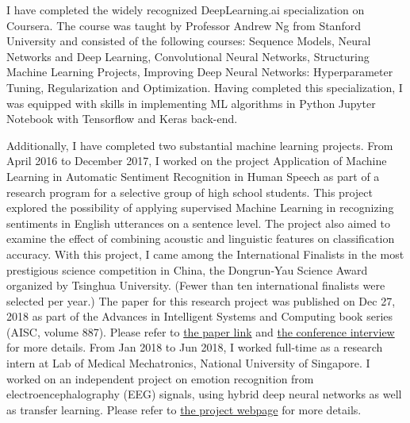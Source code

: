 \documentclass[11pt,reqno,oneside,a4paper]{article}
\begin{document}
	I have completed the widely recognized DeepLearning.ai specialization on Coursera. The course was taught by Professor Andrew Ng from Stanford University and consisted of the following courses: Sequence Models, Neural Networks and Deep Learning, Convolutional Neural Networks, Structuring Machine Learning Projects, Improving Deep Neural Networks: Hyperparameter Tuning, Regularization and Optimization. Having completed this specialization, I was equipped with skills in implementing ML algorithms in Python Jupyter Notebook with Tensorflow and Keras back-end.  
	
	Additionally, I have completed two substantial machine learning projects. From April 2016 to December 2017, I worked on the project Application of Machine Learning in Automatic Sentiment Recognition in Human Speech as part of a research program for a selective group of high school students. This project explored the possibility of applying supervised Machine Learning in recognizing sentiments in English utterances on a sentence level. The project also aimed to examine the effect of combining acoustic and linguistic features on classification accuracy. With this project, I came among the International Finalists in the most prestigious science competition in China, the Dongrun-Yau Science Award organized by Tsinghua University. (Fewer than ten international finalists were selected per year.) The paper for this research project was published on Dec 27, 2018 as part of the Advances in Intelligent Systems and Computing book series (AISC, volume 887). Please refer to \href{https://link.springer.com/chapter/10.1007/978-3-030-03405-4_41}{the paper link} and \href{https://www.youtube.com/watch?v=fwrFHwDvMnU&list=PLS161HmXR6JjDQjE-lja23OKrbkJeO0vW&index=16}{the conference interview} for more details. From Jan 2018 to Jun 2018, I worked full-time as a research intern at Lab of Medical Mechatronics, National University of Singapore. I worked on an independent project on emotion recognition from electroencephalography (EEG) signals, using hybrid deep neural networks as well as transfer learning. Please refer to \href{https://sites.google.com/view/liu-zhang/home}{the project webpage} for more details. 
	
\end{document}

